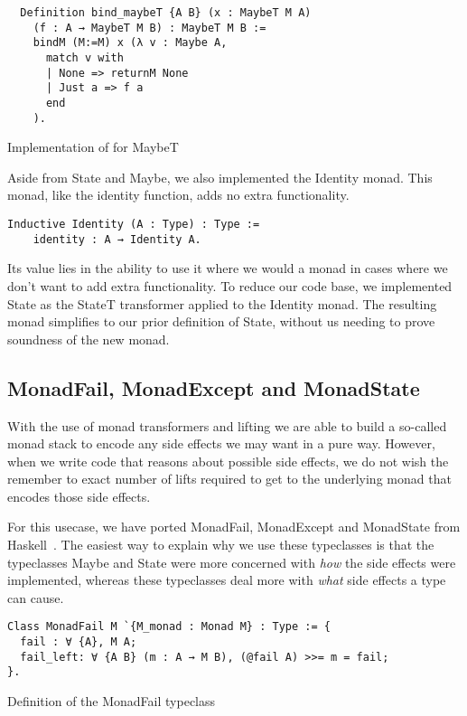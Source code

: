 \begin{listing}
\begin{verbatim}
  Definition bind_maybeT {A B} (x : MaybeT M A) 
    (f : A → MaybeT M B) : MaybeT M B :=
    bindM (M:=M) x (λ v : Maybe A,
      match v with
      | None => returnM None
      | Just a => f a
      end
    ).
\end{verbatim}
\caption{Implementation of \coq{>>= } for MaybeT}
\label{lst:bind_maybeT}
\end{listing}

Aside from State and Maybe, we also implemented the Identity monad. This monad,
like the identity function, adds no extra functionality. 
\begin{verbatim}
Inductive Identity (A : Type) : Type := 
    identity : A → Identity A.
\end{verbatim}

Its value lies in the
ability to use it where we would a monad in cases where we don't want to add
extra functionality. To reduce our code base, we implemented State as the
StateT transformer applied to the Identity monad. The resulting monad
simplifies to our prior definition of State, without us needing to prove
soundness of the new monad.


\subsection{MonadFail, MonadExcept and MonadState}
With the use of monad transformers and lifting we are able to build a so-called 
monad stack to encode any side effects we may want in a pure way. However, when
we write code that reasons about possible side effects, we do not wish the
remember to exact number of lifts required to get to the underlying monad that
encodes those side effects. 

For this usecase, we have ported MonadFail, MonadExcept and MonadState from
Haskell~\cite{gibbons2011just}. The easiest way to explain why we use these typeclasses is that 
the typeclasses Maybe and State were more concerned with
\textit{how} the side effects were implemented, whereas these typeclasses deal 
more with \textit{what} side effects a type can cause.

\begin{listing}
\begin{verbatim}
Class MonadFail M `{M_monad : Monad M} : Type := {
  fail : ∀ {A}, M A;
  fail_left: ∀ {A B} (m : A → M B), (@fail A) >>= m = fail;
}.
\end{verbatim}
\caption{Definition of the MonadFail typeclass}
\label{lst:monadfail}
\end{listing}

